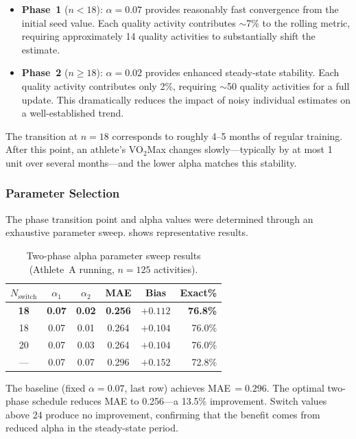 \documentclass[11pt,a4paper]{article}
\begin{document}
\begin{itemize}[nosep]
    \item \textbf{Phase~1} ($n < 18$): $\alpha = 0.07$ provides reasonably fast convergence from the initial seed value.
    Each quality activity contributes $\sim$7\% to the rolling metric, requiring approximately 14 quality activities to substantially shift the estimate.

    \item \textbf{Phase~2} ($n \geq 18$): $\alpha = 0.02$ provides enhanced steady-state stability.
    Each quality activity contributes only 2\%, requiring $\sim$50 quality activities for a full update.
    This dramatically reduces the impact of noisy individual estimates on a well-established trend.
\end{itemize}

The transition at $n = 18$ corresponds to roughly 4--5 months of regular training.
After this point, an athlete's VO$_2$Max changes slowly---typically by at most 1 unit over several months---and the lower alpha matches this stability.

\subsubsection{Parameter Selection}

The phase transition point and alpha values were determined through an exhaustive parameter sweep.
 shows representative results.

\begin{table}[H]
\centering
\caption{Two-phase alpha parameter sweep results (Athlete~A running, $n = 125$ activities).}
\label{tab:alpha-sweep}
\begin{tabular}{@{}cccccr@{}}
\toprule
$N_{\text{switch}}$ & $\alpha_1$ & $\alpha_2$ & \textbf{MAE} & \textbf{Bias} & \textbf{Exact\%} \\
\midrule
\textbf{18} & \textbf{0.07} & \textbf{0.02} & \textbf{0.256} & $\boldsymbol{+0.112}$ & \textbf{76.8\%} \\
18 & 0.07 & 0.01 & 0.264 & $+0.104$ & 76.0\% \\
20 & 0.07 & 0.03 & 0.264 & $+0.104$ & 76.0\% \\
--- & 0.07 & 0.07 & 0.296 & $+0.152$ & 72.8\% \\
\bottomrule
\end{tabular}
\end{table}

The baseline (fixed $\alpha = 0.07$, last row) achieves MAE\,$= 0.296$.
The optimal two-phase schedule reduces MAE to 0.256---a 13.5\% improvement.
Switch values above 24 produce no improvement, confirming that the benefit comes from reduced alpha in the steady-state period.
\end{document}
